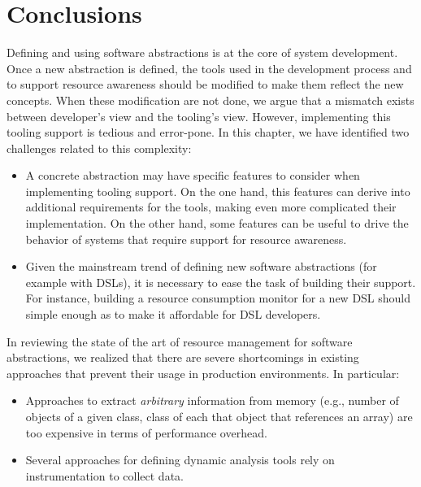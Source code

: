 \section{Conclusions}


Defining and using software abstractions is at the core of system development.
Once a new abstraction is defined, the tools used in the development process and to support resource awareness should be modified to make them reflect the new concepts.
When these modification are not done, we argue that a mismatch exists between developer's view and the tooling's view.
However, implementing this tooling support is tedious and error-pone.
In this chapter, we have identified two challenges related to this complexity:

\begin{itemize}
\item A concrete abstraction may have specific features to consider when implementing tooling support.
On the one hand, this features can derive into additional requirements for the tools, making even more complicated their implementation.
On the other hand, some features can be useful to drive the behavior of systems that require support for resource awareness.

\item Given the mainstream trend of defining new software abstractions (for example with DSLs), it is necessary to ease the task of building their support.
For instance, building a resource consumption monitor for a new DSL should simple enough as to make it affordable for DSL developers.
\end{itemize}   

In reviewing the state of the art of resource management for software abstractions, we realized that there are severe shortcomings in existing approaches that prevent their usage in production environments. In particular:

\begin{itemize}
\item Approaches to extract \textit{arbitrary} information from memory (e.g., number of objects of a given class, class of each that object that references an array) are too expensive in terms of performance overhead.

\item Several approaches for defining dynamic analysis tools rely on instrumentation to collect data. 
\end{itemize} 

%


